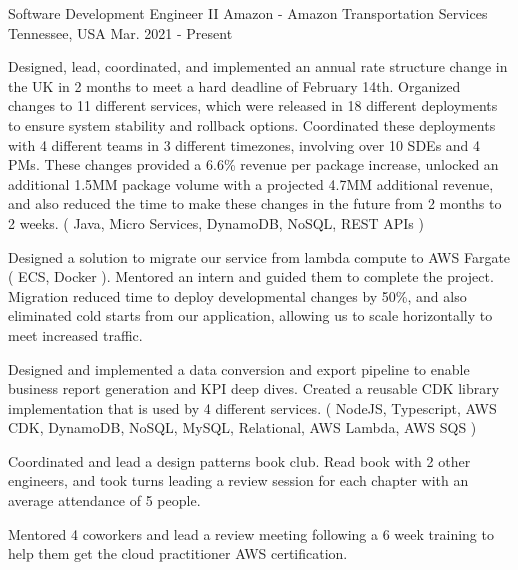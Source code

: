 

\begin{cventries}

  \cventry
    {Software Development Engineer II} %
    {Amazon - Amazon Transportation Services} %
    {Tennessee, USA} %
    {Mar. 2021 - Present} %
    {
      \begin{cvitems} %
        \item {Designed, lead, coordinated, and implemented an annual rate structure change in the UK in 2 months to meet a hard deadline of February 14th. Organized changes to 11 different services, which were released in 18 different deployments to ensure system stability and rollback options. Coordinated these deployments with 4 different teams in 3 different timezones, involving over 10 SDEs and 4 PMs. These changes provided a 6.6\% revenue per package increase, unlocked an additional 1.5MM package volume with a projected 4.7MM additional revenue, and also reduced the time to make these changes in the future from 2 months to 2 weeks. ( Java, Micro Services, DynamoDB, NoSQL, REST APIs )}
        \item {Designed a solution to migrate our service from lambda compute to AWS Fargate ( ECS, Docker ). Mentored an intern and guided them to complete the project. Migration reduced time to deploy developmental changes by 50\%, and also eliminated cold starts from our application, allowing us to scale horizontally to meet increased traffic.}
        \item {Designed and implemented a data conversion and export pipeline to enable business report generation and KPI deep dives. Created a reusable CDK library implementation that is used by 4 different services. ( NodeJS, Typescript, AWS CDK, DynamoDB, NoSQL, MySQL, Relational, AWS Lambda, AWS SQS )}
        \item {Coordinated and lead a design patterns book club. Read book with 2 other engineers, and took turns leading a review session for each chapter with an average attendance of 5 people.}
        \item {Mentored 4 coworkers and lead a review meeting following a 6 week training to help them get the cloud practitioner AWS certification.}
      \end{cvitems}
    }


\end{cventries}
